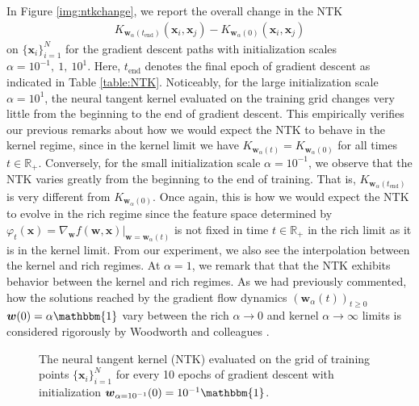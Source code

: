 \documentclass{article}
\begin{document}
In Figure \ref{img:ntkchange}, we report the overall change in the NTK
\begin{align*}
   K_{\boldsymbol{w}_{\alpha}(t_{\text{end}})}(\boldsymbol{x}_i, \boldsymbol{x}_j) -  K_{\boldsymbol{w}_{\alpha}(0)}(\boldsymbol{x}_i, \boldsymbol{x}_j)
\end{align*}
on $\{ \boldsymbol{x}_i \}_{i=1}^N$ for the gradient descent paths with initialization scales $\alpha = 10^{-1}, \ 1, \ 10^1$. Here, $t_{\text{end}}$ denotes the final epoch of gradient descent as indicated in Table \ref{table:NTK}. Noticeably, for the large initialization scale $\alpha = 10^1$, the neural tangent kernel evaluated on the training grid changes very little from the beginning to the end of gradient descent. This empirically verifies our previous remarks about how we would expect the NTK to behave in the kernel regime, since in the kernel limit we have $K_{\boldsymbol{w}_{\alpha}(t)} = K_{\boldsymbol{w}_{\alpha}(0)}$ for all times $t \in \mathbb{R}_+$. Conversely, for the small initialization scale $\alpha = 10^{-1}$, we observe that the NTK varies greatly from the beginning to the end of training. That is, $K_{\boldsymbol{w}_{\alpha}(t_{\text{end}})}$ is very different from $K_{\boldsymbol{w}_{\alpha}(0)}$. Once again, this is how we would expect the NTK to evolve in the rich regime since the feature space determined by $\varphi_t(\boldsymbol{x}) = \nabla_{\boldsymbol{w}}f(\boldsymbol{w}, \boldsymbol{x})|_{\boldsymbol{w} = \boldsymbol{w}_{\alpha}(t)}$ is not fixed in time $t \in \mathbb{R}_+$ in the rich limit as it is in the kernel limit. From our experiment, we also see the interpolation between the kernel and rich regimes. At $\alpha = 1$, we remark that that the NTK exhibits behavior between the kernel and rich regimes. As we had previously commented, how the solutions reached by the gradient flow dynamics $(\boldsymbol{w}_{\alpha}(t))_{t \geq 0}$ $\boldsymbol{w}(0) = \alpha \mathbbm{1}$ vary between the rich $\alpha \rightarrow 0$ and kernel $\alpha \rightarrow \infty$ limits is considered rigorously by Woodworth and colleagues \cite{woodworth2020kernel}.

\begin{figure}
\caption{The neural tangent kernel (NTK) evaluated on the grid of training points $\{ \boldsymbol{x}_i \}_{i=1}^N$ for every 10 epochs of gradient descent with initialization $\boldsymbol{w}_{\alpha = 10^{-1}}(0) = 10^{-1}\mathbbm{1}$.}\label{gif:ntk1}
\end{figure}
\end{document}
